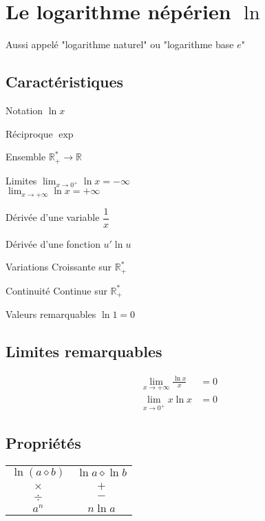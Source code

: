 \documentclass{article}
\newcommand{\R}{\mathds{R}}
\newcommand{\oo}{\infty}
\newcommand{\placeholder}{\diamond}
\newenvironment{descriptiona}{\begin{description}[leftmargin=!,labelwidth=\widthof{\bfseries The longest label}]}{\end{description}}
\begin{document}
\newpage
\section{Le logarithme népérien $\ln$}

Aussi appelé "logarithme naturel" ou "logarithme base $e$"

\subsection{Caractéristiques}
\begin{descriptiona}
\item[Notation] $\ln{x}$
\item[Réciproque] $\exp$
\item[Ensemble] $\R_+^\ast \to \R$
\item[Limites]
    $\displaystyle \lim_{x\to0^+} \ln{x} = -\oo$ \\
    $\displaystyle \lim_{x\to+\oo} \ln{x} = +\oo$
\item[Dérivée d'une variable] $\dfrac{1}{x}$
\item[Dérivée d'une fonction] $u'\ln u$
\item[Variations] Croissante sur $\R_+^\ast$
\item[Continuité] Continue sur $\R_+^\ast$
\item[Valeurs remarquables] $\ln{1} = 0$
\end{descriptiona}

\subsection{Limites remarquables}

\begin{equation*}
    \begin{split}
        \lim_{x\to+\oo} \frac{\ln x}{x} &= 0 \\
        \lim_{x\to0^+} x\ln x &= 0
    \end{split}
\end{equation*}

\label{proprietes_ln}
\subsection{Propriétés}

\begin{table}[h!]
    \centering
    \begin{tabular}{c|c}
        $\ln (a\placeholder b)$ & $\ln a \placeholder \ln b $ \\
        $\times$ & $+$ \\
        $\div$ & $-$ \\\hline
        $a^n$ &  $n\ln a$ \\
    \end{tabular}
\end{table}
\end{document}
